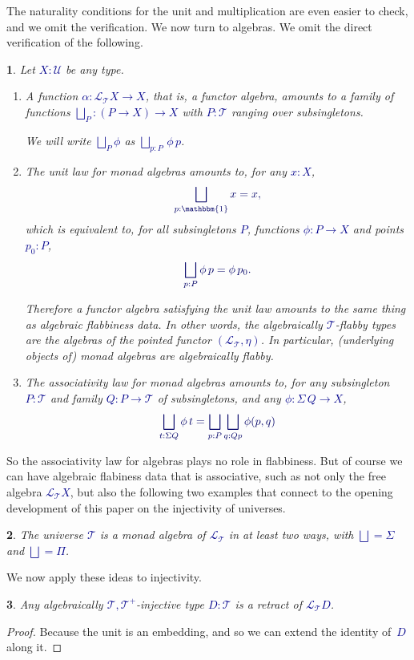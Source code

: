 \documentclass[10pt]{article}
\newcommand{\db}{\textcolor{darkblue}}
\newcommand{\m}[1]{\db{$#1$}}
\newcommand{\M}[1]{\[\db{#1}\]}
\newcommand{\U}{\mathcal{U}}
\newcommand{\T}{\mathcal{T}}
\newcommand{\Lift}{\mathcal{L}}
\newcommand{\One}{\mathbbm{1}}
\newtheorem{numbered}{}
\theoremstyle{definition}
\begin{document}
\noindent The naturality conditions for the unit and multiplication are
even easier to check, and we omit the verification. We now turn to
algebras. We omit the direct verification of the following.

\begin{numbered} Let \m{X:\U} be any type.
  \begin{enumerate}
  \item A function \m{\alpha : \Lift_\T X \to X}, that is, a functor
    algebra, amounts to a family of functions \m{\bigsqcup_P : (P \to
      X) \to X} with \m{P : \T} ranging over subsingletons.


    \medskip We will write \m{\bigsqcup_P \phi} as \m{\bigsqcup_{p : P} \, \phi \, p}.
  \item The unit law for monad algebras amounts to, for any \m{x:X},
    \M{
       \bigsqcup_{p : \One} x = x,
    }
    which is equivalent to, for all subsingletons \m{P}, functions \m{\phi : P \to X} and points \m{p_0 : P},
    \M{
       \bigsqcup_{p : P} \phi \, p = \phi \, p_0.
    }


    \medskip Therefore a functor algebra satisfying the unit law
    amounts to the same thing as algebraic flabbiness data. In other
    words, the algebraically \m{\T}-flabby types are the algebras of
    the pointed functor \m{(\Lift_\T,\eta)}. In particular,
    (underlying objects of) monad algebras are algebraically flabby.
  \item The associativity law for monad algebras amounts to, for any subsingleton \m{P :
      \T} and family \m{Q : P \to \T} of subsingletons, and any \m{\phi : \Sigma \, Q \to X},
    \M{
      \bigsqcup_{t : \Sigma Q} \phi \, t = \bigsqcup_{p : P} \bigsqcup_{q : Q p} \phi (p ,q)
    }
  \end{enumerate}
\end{numbered}
\noindent So the associativity law for algebras plays no role in
flabbiness. But of course we can have algebraic flabiness data that is
associative, such as not only the free algebra \m{\Lift_\T X}, but
also the following two examples that connect to the opening
development of this paper on the injectivity of universes.
\begin{numbered} The universe \m{\T} is a monad algebra of
  \m{\Lift_\T} in at least two ways, with \m{\bigsqcup = \Sigma} and
  \m{\bigsqcup = \Pi}.
\end{numbered}


We now apply these ideas to injectivity.
\begin{numbered}
  Any algebraically \m{\T,\T^+}-injective type \m{D:\T} is a retract of \m{\Lift_\T D}.
\end{numbered}
\begin{proof}
  Because the unit is an embedding, and so we can extend the identity of~\m{D} along it.
\end{proof}
\end{document}
